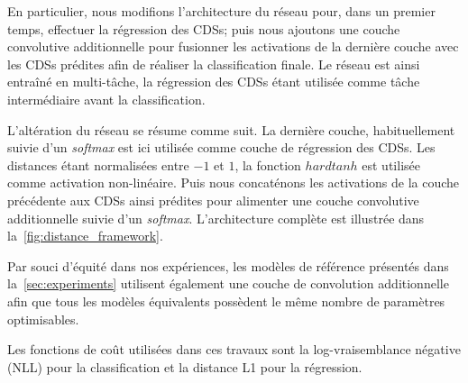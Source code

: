 En particulier, nous modifions l'architecture du réseau pour, dans un premier temps, effectuer la régression des \glspl{CDS}; puis nous ajoutons une couche convolutive additionnelle pour fusionner les activations de la dernière couche avec les \glspl{CDS} prédites afin de réaliser la classification finale. Le réseau est ainsi entraîné en multi-tâche, la régression des \glspl{CDS} étant utilisée comme tâche intermédiaire avant la classification.

L'altération du réseau se résume comme suit. La dernière couche, habituellement suivie d'un \textit{softmax} est ici utilisée comme couche de régression des \glspl{CDS}. Les distances étant normalisées entre $-1$ et $1$, la fonction $hardtanh$ est utilisée comme activation non-linéaire. Puis nous concaténons les activations de la couche précédente aux \glspl{CDS} ainsi prédites pour alimenter une couche convolutive additionnelle suivie d'un \textit{softmax}. L'architecture complète est illustrée dans la~\cref{fig:distance_framework}.

Par souci d'équité dans nos expériences, les modèles de référence présentés dans la~\cref{sec:experiments} utilisent également une couche de convolution additionnelle afin que tous les modèles équivalents possèdent le même nombre de paramètres optimisables.

Les fonctions de coût utilisées dans ces travaux sont la log-vraisemblance négative (NLL) pour la classification et la distance L1 pour la régression.

